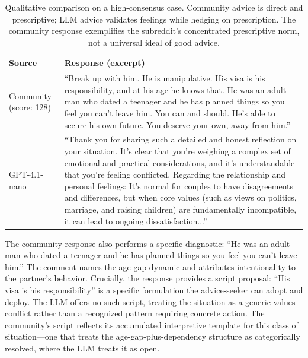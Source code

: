 \begin{table}[t]
\centering
\caption{Qualitative comparison on a high-consensus case. Community advice is direct and prescriptive; LLM advice validates feelings while hedging on prescription. The community response exemplifies the subreddit's concentrated prescriptive norm, not a universal ideal of good advice.}
\label{tab:qualitative_example}
\small
\begin{tabular}{p{}p{}}
\toprule
\textbf{Source} & \textbf{Response (excerpt)} \\
\midrule
Community (score: 128) & ``Break up with him. He is manipulative. His visa is his responsibility, and at his age he knows that. He was an adult man who dated a teenager and he has planned things so you feel you can't leave him. You can and should. He's able to secure his own future. You deserve your own, away from him.'' \\
\addlinespace
GPT-4.1-nano & ``Thank you for sharing such a detailed and honest reflection on your situation. It's clear that you're weighing a complex set of emotional and practical considerations, and it's understandable that you're feeling conflicted. Regarding the relationship and personal feelings: It's normal for couples to have disagreements and differences, but when core values (such as views on politics, marriage, and raising children) are fundamentally incompatible, it can lead to ongoing dissatisfaction...'' \\
\bottomrule
\end{tabular}
\end{table}

The community response also performs a specific diagnostic: ``He was an adult man who dated a teenager and he has planned things so you feel you can't leave him.'' The comment names the age-gap dynamic and attributes intentionality to the partner's behavior. Crucially, the response provides a script proposal: ``His visa is his responsibility'' is a specific formulation the advice-seeker can adopt and deploy. The LLM offers no such script, treating the situation as a generic values conflict rather than a recognized pattern requiring concrete action. The community's script reflects its accumulated interpretive template for this class of situation---one that treats the age-gap-plus-dependency structure as categorically resolved, where the LLM treats it as open.

